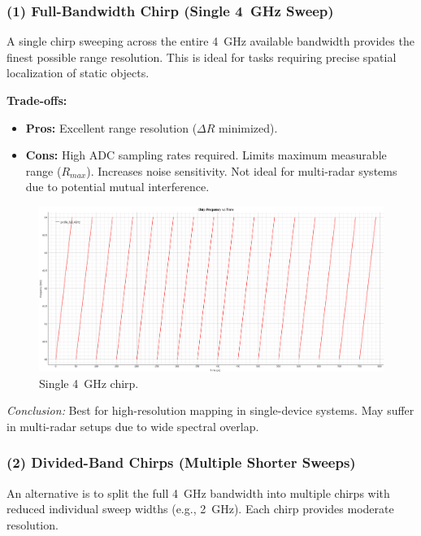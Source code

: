 \subsubsection*{(1) Full-Bandwidth Chirp (Single 4~GHz Sweep)}

A single chirp sweeping across the entire 4~GHz available bandwidth provides the finest possible range resolution.
This is ideal for tasks requiring precise spatial localization of static objects.

\textbf{Trade-offs:}
\begin{itemize}
    \item \textbf{Pros:} Excellent range resolution ($\Delta R$ minimized).
    \item \textbf{Cons:} High ADC sampling rates required. Limits maximum measurable range ($R_{max}$). Increases noise sensitivity. Not ideal for multi-radar systems due to potential mutual interference.
\end{itemize}

\begin{figure}[!htbp]
    \centering
    \includegraphics[width=1.0\linewidth]{images/profile_full_4GHz.png}
    \caption{Single 4~GHz chirp.}
    \label{fig:profile4GHz}
\end{figure}

{\small
\textit{Conclusion:} Best for high-resolution mapping in single-device systems.
May suffer in multi-radar setups due to wide spectral overlap.
}

\vspace{1em}

\subsubsection*{(2) Divided-Band Chirps (Multiple Shorter Sweeps)}

An alternative is to split the full 4~GHz bandwidth into multiple chirps with reduced individual sweep widths (e.g., 2~GHz).
Each chirp provides moderate resolution.

